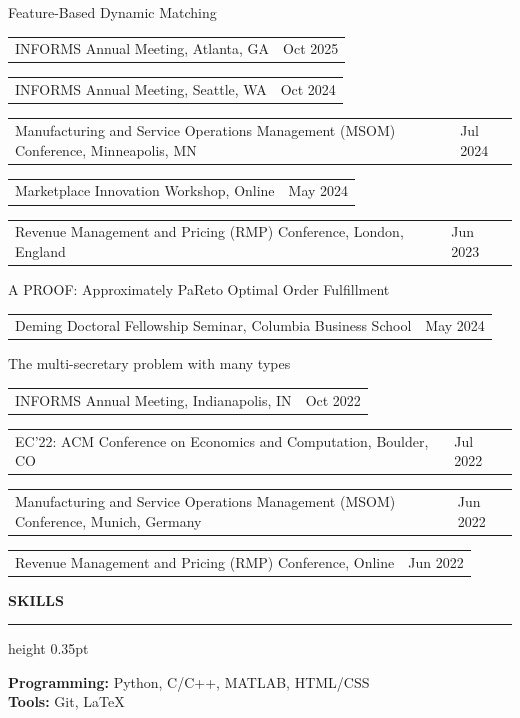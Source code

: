 \documentclass[11pt,letterpaper]{article}
\makeatletter
\newcommand{\cvsection}[1]{%
  \Needspace{8\baselineskip}%
  \vspace{1.05em}%
  {\fontsize{14}{16}\selectfont\bfseries\MakeUppercase{#1}}\par
  \vspace{2pt}%
  \hrule height 0.35pt
  \vspace{0.72em}%
}
\newcommand{\talktitle}[1]{%
  \vspace{0.45em}%
  {\raggedright #1\par}%
  \vspace{0.12em}%
}
\newcommand{\talkvenuefont}{\fontsize{9.1}{10.5}\selectfont}
\newcommand{\talkvenue}[2]{%
  \noindent\hspace*{0.25in}%
  {\talkvenuefont
  \begin{tabularx}{\dimexpr\textwidth-0.25in\relax}{@{}>{\raggedright\arraybackslash}X>{\raggedleft\arraybackslash}p{0.95in}@{}}
    #1 & #2
  \end{tabularx}}\par
}
\makeatother
\begin{document}
\talktitle{Feature-Based Dynamic Matching}
\talkvenue{INFORMS Annual Meeting, Atlanta, GA}{Oct 2025}
\talkvenue{INFORMS Annual Meeting, Seattle, WA}{Oct 2024}
\talkvenue{Manufacturing and Service Operations Management (MSOM) Conference, Minneapolis, MN}{Jul 2024}
\talkvenue{Marketplace Innovation Workshop, Online}{May 2024}
\talkvenue{Revenue Management and Pricing (RMP) Conference, London, England}{Jun 2023}

\talktitle{\textup{A PROOF}: Approximately PaReto Optimal Order Fulfillment}
\talkvenue{Deming Doctoral Fellowship Seminar, Columbia Business School}{May 2024}

\talktitle{The multi-secretary problem with many types}
\talkvenue{INFORMS Annual Meeting, Indianapolis, IN}{Oct 2022}
\talkvenue{EC'22: ACM Conference on Economics and Computation, Boulder, CO}{Jul 2022}
\talkvenue{Manufacturing and Service Operations Management (MSOM) Conference, Munich, Germany}{Jun 2022}
\talkvenue{Revenue Management and Pricing (RMP) Conference, Online}{Jun 2022}

\cvsection{Skills}
\textbf{Programming:} Python, C/C++, MATLAB, HTML/CSS\\
\textbf{Tools:} Git, \LaTeX
\end{document}
